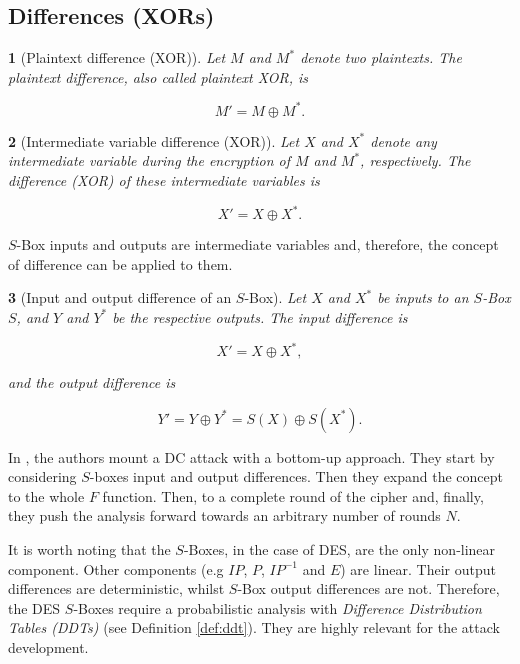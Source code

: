 \documentclass{report}
\newtheorem*{concept}{}{\bfseries}{\itshape}
\begin{document}
\subsection{Differences (XORs)}\label{sec:differences}

\begin{concept}[Plaintext difference (XOR)]
Let $M$ and $M^*$ denote two plaintexts. The plaintext difference, also called \emph{plaintext XOR}, is 

$$
M' = M \oplus M^*.
$$
\end{concept}

\begin{concept}[Intermediate variable difference (XOR)]
Let $X$ and $X^*$ denote any intermediate variable during the encryption of $M$ and $M^*$, respectively. The difference (XOR) of these intermediate variables is 

$$
X' = X \oplus X^*.
$$
\end{concept}

$S$-Box inputs and outputs are intermediate variables and, therefore, the concept of difference can be applied to them.

\begin{concept}[Input and output difference of an $S$-Box]
Let $X$ and $X^*$ be inputs to an $S$-Box $S$, and $Y$ and $Y^*$ be the respective outputs. The input difference is 

$$
X' = X \oplus X^*,
$$

and the output difference is 

$$
Y' = Y \oplus Y^* = S(X) \oplus S(X^*).
$$
\end{concept}

In \cite{Shamir}, the authors mount a DC attack with a bottom-up approach. They start by considering $S$-boxes input and output differences. Then they expand the concept to the whole $F$ function. Then, to a complete round of the cipher and, finally, they push the analysis forward towards an arbitrary number of rounds $N$.

It is worth noting that the $S$-Boxes, in the case of DES, are the only non-linear component. Other components (e.g $IP$, $P$, $IP^{-1}$ and $E$) are linear. Their output differences are deterministic, whilst $S$-Box output differences are not. Therefore, the DES $S$-Boxes require a probabilistic analysis with \emph{Difference Distribution Tables (DDTs)} (see Definition \ref{def:ddt}). They are highly relevant for the attack development.
\end{document}
